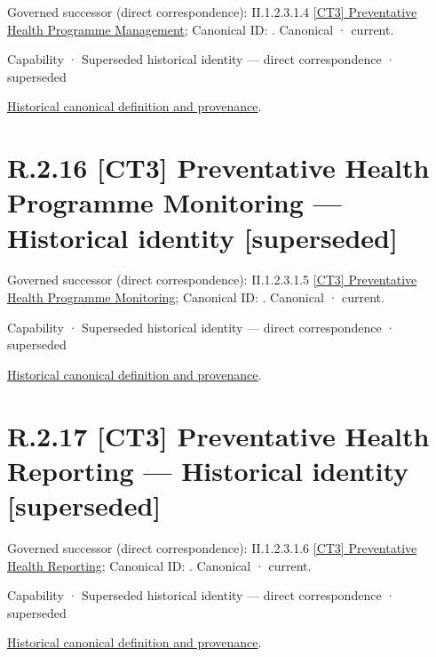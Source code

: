 {\small Governed successor (direct correspondence): II.1.2.3.1.4 \hyperref[element:563d36b179d34cb6913253d06e8d77f6]{[CT3] Preventative Health Programme Management}; Canonical ID: \texttt{}. Canonical · current.}\par
\label{element:d71def9e76a544ff9761c672bb24f3be}
{\small Capability · Superseded historical identity — direct correspondence · superseded}\par
\href{../../../../continuum/strategy/capability/d71def9e76a544ff9761c672bb24f3be.md}{Historical canonical definition and provenance}.\par
\section*{R.2.16 [CT3] Preventative Health Programme Monitoring — Historical identity [superseded]}
\label{navigation:R.2.16}

{\small Governed successor (direct correspondence): II.1.2.3.1.5 \hyperref[element:945b40ced8004e1cbf7c98c731d17daf]{[CT3] Preventative Health Programme Monitoring}; Canonical ID: \texttt{}. Canonical · current.}\par
\label{element:e05f6310f6d544efaca5568604f27dd8}
{\small Capability · Superseded historical identity — direct correspondence · superseded}\par
\href{../../../../continuum/strategy/capability/e05f6310f6d544efaca5568604f27dd8.md}{Historical canonical definition and provenance}.\par
\section*{R.2.17 [CT3] Preventative Health Reporting — Historical identity [superseded]}
\label{navigation:R.2.17}

{\small Governed successor (direct correspondence): II.1.2.3.1.6 \hyperref[element:d2ef01c4cab348df822e802ab084faae]{[CT3] Preventative Health Reporting}; Canonical ID: \texttt{}. Canonical · current.}\par
\label{element:4faef45b4ebe4fa69e57c3d81bfea05f}
{\small Capability · Superseded historical identity — direct correspondence · superseded}\par
\href{../../../../continuum/strategy/capability/4faef45b4ebe4fa69e57c3d81bfea05f.md}{Historical canonical definition and provenance}.\par
